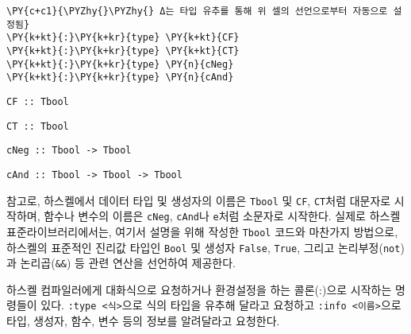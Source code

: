     \begin{tcolorbox}[breakable, size=fbox, boxrule=1pt, pad at break*=1mm,colback=cellbackground, colframe=cellborder, top=.75ex]
\begin{Verbatim}[commandchars=\\\{\}]
\PY{c+c1}{\PYZhy{}\PYZhy{} Δ는 타입 유추를 통해 위 셀의 선언으로부터 자동으로 설정됨}
\PY{k+kt}{:}\PY{k+kr}{type} \PY{k+kt}{CF}
\PY{k+kt}{:}\PY{k+kr}{type} \PY{k+kt}{CT}
\PY{k+kt}{:}\PY{k+kr}{type} \PY{n}{cNeg}
\PY{k+kt}{:}\PY{k+kr}{type} \PY{n}{cAnd}
\end{Verbatim}
\end{tcolorbox}

    
    \begin{Verbatim}[commandchars=\\\{\}]
CF :: Tbool
    \end{Verbatim}

    
    
    \begin{Verbatim}[commandchars=\\\{\}]
CT :: Tbool
    \end{Verbatim}

    
    
    \begin{Verbatim}[commandchars=\\\{\}]
cNeg :: Tbool -> Tbool
    \end{Verbatim}

    
    
    \begin{Verbatim}[commandchars=\\\{\}]
cAnd :: Tbool -> Tbool -> Tbool
    \end{Verbatim}

    
    \noindent 참고로, 하스켈에서 데이터 타입 및 생성자의 이름은
\texttt{Tbool} 및 \texttt{CF}, \texttt{CT}처럼 대문자로 시작하며, 함수나
변수의 이름은 \texttt{cNeg}, \texttt{cAnd}나 \texttt{e}처럼 소문자로
시작한다. 실제로 하스켈 표준라이브러리에서는, 여기서 설명을 위해 작성한
\texttt{Tbool} 코드와 마찬가지 방법으로, 하스켈의 표준적인 진리값 타입인
\texttt{Bool} 및 생성자 \texttt{False}, \texttt{True}, 그리고
논리부정(\texttt{not})과 논리곱(\texttt{\&\&}) 등 관련 연산을 선언하여
제공한다.

하스켈 컴파일러에게 대화식으로 요청하거나 환경설정을 하는 콜론(:)으로
시작하는 명령들이 있다. \texttt{:type\ \textless{}식\textgreater{}}으로
식의 타입을 유추해 달라고 요청하고
\texttt{:info\ \textless{}이름\textgreater{}}으로 타입, 생성자, 함수,
변수 등의 정보를 알려달라고 요청한다.\vspace*{-.75ex}

